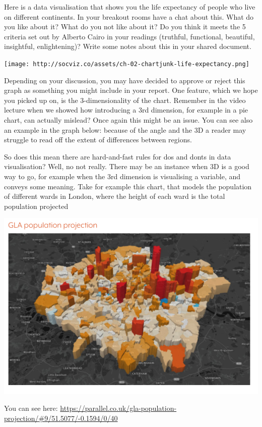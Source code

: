 \documentclass[
]{book}
\begin{document}
Here is a data visualisation that shows you the life expectancy of people who live on different continents. In your breakout rooms have a chat about this. What do you like about it? What do you not like about it? Do you think it meets the 5 criteria set out by Alberto Cairo in your readings (truthful, functional, beautiful, insightful, enlightening)? Write some notes about this in your shared document.

\texttt{[image: http://socviz.co/assets/ch-02-chartjunk-life-expectancy.png]}

Depending on your discussion, you may have decided to approve or reject this graph as something you might include in your report. One feature, which we hope you picked up on, is the 3-dimensionality of the chart. Remember in the video lecture when we showed how introducing a 3rd dimension, for example in a pie chart, can actually mislead? Once again this might be an issue. You can see also an example in the graph below: because of the angle and the 3D a reader may struggle to read off the extent of differences between regions.

So does this mean there are hard-and-fast rules for dos and donts in data visualisation? Well, no not really. There may be an instance when 3D is a good way to go, for example when the 3rd dimension is visualising a variable, and conveys some meaning. Take for example this chart, that models the population of different wards in London, where the height of each ward is the total population projected

\includegraphics{imgs/gla_pop.png}

You can see here: \url{https://parallel.co.uk/gla-population-projection/\#9/51.5077/-0.1594/0/40}
\end{document}
